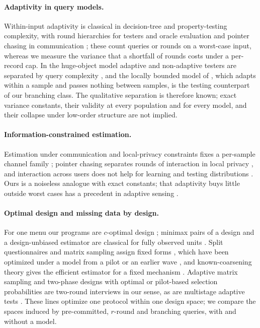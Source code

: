 \documentclass{article}
\begin{document}
\paragraph{Adaptivity in query models.} Within-input adaptivity is classical in decision-tree and property-testing complexity, with round hierarchies for testers and oracle evaluation \citep{canonne2018,li2026regex} and pointer chasing in communication \citep{nisan1993}; these count queries or rounds on a worst-case input, whereas we measure the variance that a shortfall of rounds costs under a per-record cap. In the huge-object model adaptive and non-adaptive testers are separated by query complexity \citep{goldreich2022,chakraborty2023}, and the locally bounded model of \citet{adar2024}, which adapts within a sample and passes nothing between samples, is the testing counterpart of our branching class. The qualitative separation is therefore known; exact variance constants, their validity at every population and for every model, and their collapse under low-order structure are not implied.

\paragraph{Information-constrained estimation.} Estimation under communication and local-privacy constraints fixes a per-sample channel family \citep{acharya2019,barnes2020}; pointer chasing separates rounds of interaction in local privacy \citep{joseph2019,joseph2020}, and interaction across users does not help for learning and testing distributions \citep{acharya2022tit,lau2026}. Ours is a noiseless analogue with exact constants; that adaptivity buys little outside worst cases has a precedent in adaptive sensing \citep{ariascastro2013}.

\paragraph{Optimal design and missing data by design.} For one menu our programs are $c$-optimal design \citep{elfving1952,pukelsheim1993,sagnol2011}; minimax pairs of a design and a design-unbiased estimator are classical for fully observed units \citep{stenger1979,gabler1990,aronow2026}. Split questionnaires and matrix sampling assign fixed forms \citep{raghunathan1995,graham2006,thomas2006,chipperfield2009,rhemtulla2012}, which have been optimized under a model from a pilot or an earlier wave \citep{adiguzel2008,jang2022}, and known-coarsening theory gives the efficient estimator for a fixed mechanism \citep{robins1994,tsiatis2006}. Adaptive matrix sampling \citep{gonzalez2008} and two-phase designs with optimal or pilot-based selection probabilities \citep{reilly1995,gilbert2014,mcisaac2015,tao2020,chen2020,chen2022} are two-round interviews in our sense, as are multistage adaptive tests \citep{yamamoto2018,fink2024}. These lines optimize one protocol within one design space; we compare the spaces induced by pre-committed, $r$-round and branching queries, with and without a model.
\end{document}
